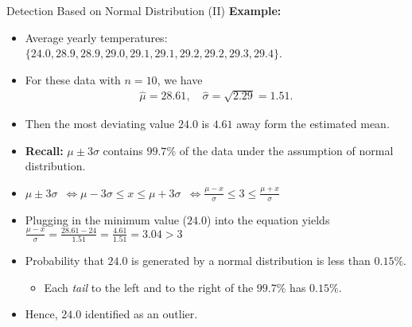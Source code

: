 \begin{frame}{Detection Based on Normal Distribution (II)}
	\textbf{Example:}
	\begin{itemize}
		\item Average yearly temperatures: $\{24.0, 28.9, 28.9, 29.0, 29.1, 29.1, 29.2, 29.2, 29.3, 29.4\}$.
		\item For these data with $n = 10$, we have
		      \begin{align*}
			      \widehat{\mu}=28.61, \quad \widehat{\sigma}=\sqrt{2.29}=1.51.
		      \end{align*}
		\item Then the most deviating value $24.0$ is $4.61$ away form the estimated mean.
		\item \textbf{Recall:} $\mu \pm 3\sigma $ contains $99.7\%$ of the data under the assumption of normal distribution.
		\item $\mu \pm 3\sigma$\pause~$ \Leftrightarrow \mu - 3\sigma \leq x \le \mu + 3\sigma$\pause~$ \Leftrightarrow \frac{\mu - x}{\sigma} \leq 3 \leq \frac{\mu + x}{\sigma}$
		\item Plugging in the minimum value ($24.0$) into the equation yields $\frac{\mu-x}{\sigma} = \frac{28.61 - 24}{1.51} =\frac{4.61}{1.51}  =  3.04  >  3$
		\item Probability that $24.0$ is generated by a normal distribution is less than $0.15\%$.
		      \begin{itemize}
			      \item Each \emph{tail} to the left and to the right of the $99.7\%$ has $0.15\%$.
		      \end{itemize}
		\item Hence, $24.0$ identified as an outlier.
	\end{itemize}
\end{frame}


